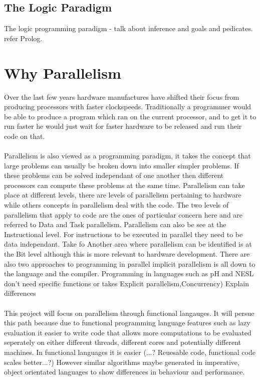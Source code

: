\documentclass{report}
\begin{document}
\subsection{The Logic Paradigm}
The logic programming paradigm - talk about inference and goals and pedicates. refer Prolog.

\section{Why Parallelism}
Over the last few years hardware manufactures have shifted their focus from producing processors with faster clockspeeds. Traditionally a programmer would be able to produce a program which ran on the current processor, and to get it to run faster he would just wait for faster hardware to be released and run their code on that.  

\paragraph{}
Parallelism is also viewed as a programming paradigm, it takes the concept that large problems can usually be broken down into smaller simpler problems. If these problems can be solved independant of one another then different processors can compute these problems at the same time. Parallelism can take place at different levels, there are levels of parallelism pertaining to hardware while others concepts in parallelism deal with the code. The two levels of parallelism that apply to code are the ones of particular concern here and are referred to Data and Task parallelism. Parallelism can also be see at the Instructional level. For instructions to be executed in parallel they need to be data independant. Take fo  Another area where parallelism can be identified is at the Bit level although this is more relevant to hardware development. There are also two approaches to programming in parallel implicit parallelism is all down to the language and the compiler. Programming in languages such as pH and NESL don't need specific functions or  takes Explicit parallelism,Concurrency) Explain differences

\paragraph{}
This project will focus on parallelism through functional langauges. It will persue this path because due to functional programming language features such as lazy evaluation it easier to write code that allows more computations to be evaluated seperately on either different threads, different cores and potentially different machines. In functional languages it is easier (...? Reuesable code, functional code scales better...?) However similar algorithms maybe generated in imperative, object orientated languages to show differences in behaviour and performance. 
\end{document}
